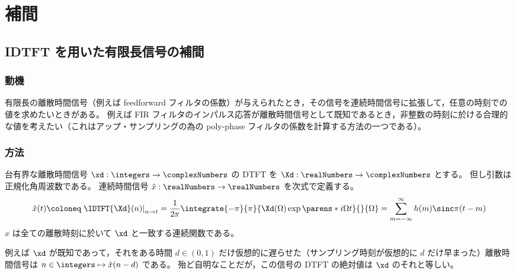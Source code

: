 \chapter{補間}
    \section{IDTFT を用いた有限長信号の補間}
        \label{IDTFT を用いた有限長信号の補間}
        \subsection{動機}
            有限長の離散時間信号（例えば feedforward フィルタの係数）が与えられたとき，その信号を連続時間信号に拡張して，任意の時刻での値を求めたいときがある。
            例えば FIR フィルタのインパルス応答が離散時間信号として既知であるとき，非整数の時刻に於ける合理的な値を考えたい（これはアップ・サンプリングの為の poly-phase フィルタの係数を計算する方法の一つである）。
        \subsection{方法}
            \label{IDTFT を用いた有限長信号の補間>方法}
            台有界な離散時間信号 $\xd:\integers\to\complexNumbers$ の DTFT を $\Xd:\realNumbers\to\complexNumbers$ とする。
            但し引数は正規化角周波数である。
            連続時間信号 $\hat{x}:\realNumbers\to\realNumbers$ を次式で定義する。
            \[ \hat{x}(t)\coloneq\left.\IDTFT{\Xd}(n)\right|_{n\to t} = \frac{1}{2\pi}\integrate{-\pi}{\pi}{\Xd(\Omega)\exp\parens*{i\Omega t}}{}{\Omega} = \sum_{m=-\infty}^\infty h(m)\sinc\pi(t-m) \]
            $\hat{x}$ は全ての離散時刻に於いて $\xd$ と一致する連続関数である。
            \par
            例えば $\xd$ が既知であって，それをある時間 $d\in(0,1)$ だけ仮想的に遅らせた（サンプリング時刻が仮想的に $d$ だけ早まった）離散時間信号は $n\in\integers\mapsto\hat{x}(n-d)$ である。
            殆ど自明なことだが，この信号の DTFT の絶対値は $\xd$ のそれと等しい。
